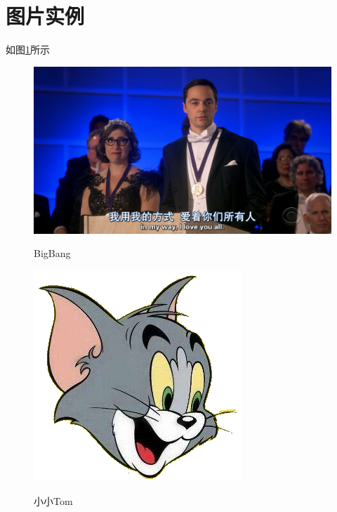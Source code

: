 \documentclass{bucthesis}
\begin{document}
\section{图片实例}{\par
	如图\ref{fig2-bigbang}所示
	\begin{figure}[htb]
		\begin{center}
			\includegraphics[width=\linewidth]{image/BigBang.png}\\
			\caption{BigBang}
			\label{fig2-bigbang}
		\end{center}
	\end{figure}
\begin{figure}[htb]
	\begin{center}
		\includegraphics[scale=0.8]{image/tom.jpeg}\\
		\caption{小小Tom}
		\label{fig1-tom}
	\end{center}
\end{figure}
}
	
	
\clearpage
\end{document}

